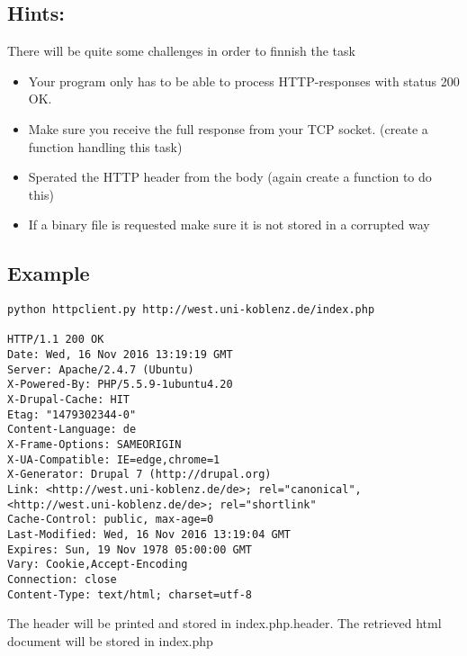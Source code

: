 \documentclass{WeSTassignment}
\begin{document}
\subsection{Hints:}
There will be quite some challenges in order to finnish the task
\begin{itemize}
\item Your program only has to be able to process HTTP-responses with status 200 OK.
\item Make sure you receive the full response from your TCP socket. (create a function handling this task)
\item Sperated the HTTP header from the body (again create a function to do this)
\item If a binary file is requested make sure it is not stored in a corrupted way
\end{itemize}


\subsection{Example}
\begin{lstlisting}
python httpclient.py http://west.uni-koblenz.de/index.php

HTTP/1.1 200 OK
Date: Wed, 16 Nov 2016 13:19:19 GMT
Server: Apache/2.4.7 (Ubuntu)
X-Powered-By: PHP/5.5.9-1ubuntu4.20
X-Drupal-Cache: HIT
Etag: "1479302344-0"
Content-Language: de
X-Frame-Options: SAMEORIGIN
X-UA-Compatible: IE=edge,chrome=1
X-Generator: Drupal 7 (http://drupal.org)
Link: <http://west.uni-koblenz.de/de>; rel="canonical",<http://west.uni-koblenz.de/de>; rel="shortlink"
Cache-Control: public, max-age=0
Last-Modified: Wed, 16 Nov 2016 13:19:04 GMT
Expires: Sun, 19 Nov 1978 05:00:00 GMT
Vary: Cookie,Accept-Encoding
Connection: close
Content-Type: text/html; charset=utf-8

\end{lstlisting}
The header will be printed and stored in index.php.header. The retrieved html document will be stored in index.php
\end{document}
